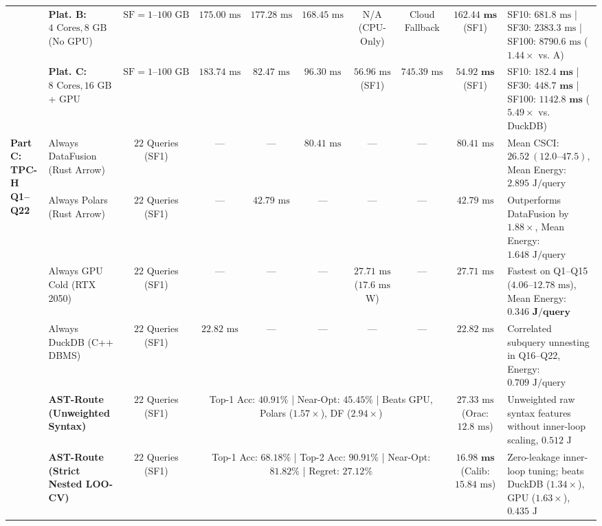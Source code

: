 \documentclass[10pt,a4paper]{article}
\newenvironment{fitasttable}{%
  \begin{lrbox}{\asttblbox}%
}{%
  \end{lrbox}%
  \sbox{\asttblboxB}{%
    \ifdim\wd\asttblbox>0.96\textwidth
      \resizebox{0.96\textwidth}{!}{\usebox{\asttblbox}}%
    \else
      \usebox{\asttblbox}%
    \fi
  }%
  \ifdim\ht\asttblboxB>0.72\textheight
    \resizebox{!}{0.72\textheight}{\usebox{\asttblboxB}}%
  \else
    \usebox{\asttblboxB}%
  \fi
}
\begin{document}
\begin{table}[!htbp]
\begin{fitasttable}
\begin{tabular}{@{}llcccccccl@{}}
 & \textbf{Plat. B:} $4\text{ Cores}, 8\text{ GB}$ (No GPU) & $\text{SF}=1\text{--}100\text{ GB}$ & $175.00\text{ ms}$ & $177.28\text{ ms}$ & $168.45\text{ ms}$ & N/A (CPU-Only) & Cloud Fallback & $\mathbf{162.44\text{ ms}}$ (SF1) & SF10: $681.8\text{ ms}$ | SF30: $2383.3\text{ ms}$ | SF100: $8790.6\text{ ms}$ ($\mathbf{1.44\times}$ vs. A) \\
 & \textbf{Plat. C:} $8\text{ Cores}, 16\text{ GB}$ + GPU & $\text{SF}=1\text{--}100\text{ GB}$ & $183.74\text{ ms}$ & $82.47\text{ ms}$ & $96.30\text{ ms}$ & $56.96\text{ ms}$ (SF1) & $745.39\text{ ms}$ & $\mathbf{54.92\text{ ms}}$ (SF1) & SF10: $\mathbf{182.4\text{ ms}}$ | SF30: $\mathbf{448.7\text{ ms}}$ | SF100: $\mathbf{1142.8\text{ ms}}$ ($\mathbf{5.49\times}$ vs. DuckDB) \\
\midrule
\multirow{6}{*}{\textbf{Part C: TPC-H Q1--Q22}}
 & Always DataFusion (Rust Arrow) & $22$ Queries (SF1) & --- & --- & $80.41\text{ ms}$ & --- & --- & $80.41\text{ ms}$ & Mean CSCI: $26.52\ (12.0\text{--}47.5)$, Mean Energy: $2.895\text{ J/query}$ \\
 & Always Polars (Rust Arrow) & $22$ Queries (SF1) & --- & $42.79\text{ ms}$ & --- & --- & --- & $42.79\text{ ms}$ & Outperforms DataFusion by $1.88\times$, Mean Energy: $1.648\text{ J/query}$ \\
 & Always GPU Cold (RTX 2050) & $22$ Queries (SF1) & --- & --- & --- & $27.71\text{ ms}$ ($17.6\text{ ms}$ W) & --- & $27.71\text{ ms}$ & Fastest on Q1--Q15 ($4.06\text{--}12.78\text{ ms}$), Mean Energy: $\mathbf{0.346\text{ J/query}}$ \\
 & Always DuckDB (C++ DBMS) & $22$ Queries (SF1) & $22.82\text{ ms}$ & --- & --- & --- & --- & $22.82\text{ ms}$ & Correlated subquery unnesting in Q16--Q22, Energy: $0.709\text{ J/query}$ \\
 & \textbf{AST-Route (Unweighted Syntax)} & $22$ Queries (SF1) & \multicolumn{5}{c}{Top-1 Acc: $40.91\%$ | Near-Opt: $45.45\%$ | Beats GPU, Polars ($1.57\times$), DF ($2.94\times$)} & $27.33\text{ ms}$ (Orac: $12.8\text{ ms}$) & Unweighted raw syntax features without inner-loop scaling, $0.512\text{ J}$ \\
 & \textbf{AST-Route (Strict Nested LOO-CV)} & $22$ Queries (SF1) & \multicolumn{5}{c}{Top-1 Acc: $\mathbf{68.18\%}$ | Top-2 Acc: $\mathbf{90.91\%}$ | Near-Opt: $\mathbf{81.82\%}$ | Regret: $\mathbf{27.12\%}$} & $\mathbf{16.98\text{ ms}}$ (Calib: $15.84\text{ ms}$) & Zero-leakage inner-loop tuning; beats DuckDB ($1.34\times$), GPU ($1.63\times$), $0.435\text{ J}$ \\

\end{tabular}
\end{fitasttable}
\end{table}
\end{document}
